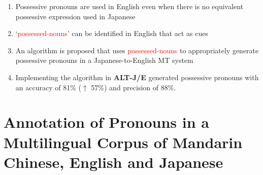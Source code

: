 \documentclass[a4paper,landscape,headrule,footrule,dvips]{foils}
\newcommand{\trg}[1]{\textcolor{red}{#1}}
\begin{document}
\begin{CJK}{UTF8}{min}







  \begin{enumerate}
  \item Possessive pronouns are used in English even when there is no
    equivalent possessive expression used in Japanese
  \item `\trg{possessed-nouns}' can be identified in English that act
    as cues 
  \item An algorithm is proposed that uses \trg{possessed-nouns} to
    appropriately generate possessive pronouns in a
    Japanese-to-English MT system
  \item Implementing the algorithm in {\bf ALT-J/E} generated
    possessive pronouns with an accuracy of 81\% ($\uparrow$ 57\%)
    and precision of 88\%.
   
  \end{enumerate}


\section{Annotation of Pronouns 
in a Multilingual Corpus 
 of Mandarin Chinese, English and Japanese}



\end{CJK}
\end{document}
